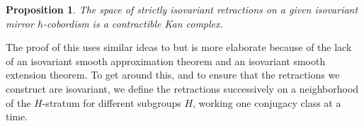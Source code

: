 \documentclass[11pt]{amsart}
\newtheorem{prop}{Proposition}[section]
\theoremstyle{definition}
\numberwithin{equation}{section}
\numberwithin{figure}{section}
\newcommand{\mirror}{{mirror}}
\begin{document}
\begin{prop}\label{retracts_contractible}
	The space of strictly isovariant retractions on a given isovariant {\mirror} $h$-cobordism is a contractible Kan complex.
\end{prop}

The proof of this uses similar ideas to \cite[Prop 4.6]{GIMM1} but is more elaborate because of the lack of an isovariant smooth approximation theorem and an isovariant smooth extension theorem. To get around this, and to ensure that the retractions we construct are isovariant, we define the retractions successively on a neighborhood of the $H$-stratum for different subgroups $H$, working one conjugacy class at a time.
\end{document}
